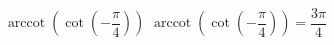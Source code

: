  {$\operatorname{arccot}\left(\cot\left(-\dfrac{\pi}{4}\right) \right)$}
{ $\operatorname{arccot}\left(\cot\left(-\dfrac{\pi}{4}\right) \right) = \dfrac{3\pi}{4}$}
